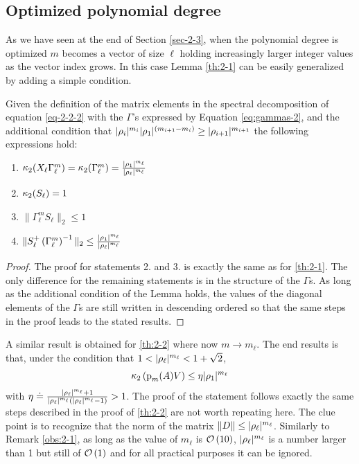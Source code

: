 \subsection{Optimized polynomial degree}
As we have seen at the end of Section \ref{sec-2-3}, when the polynomial degree is optimized $m$ becomes a vector of size $\ell$ holding increasingly larger integer values as the vector index grows. In this case Lemma \ref{th:2-1} can be easily generalized by adding a simple condition.
\begin{lemma}
\label{th:2-3}
Given the definition of the matrix elements in the spectral decomposition of equation \eqref{eq-2-2-2} with the $\Gamma$'s expressed by Equation \ref{eq:gammas-2}, and the additional condition that $|\rho_{i}|^{m_i} |\rho_{1}|^{(m_{i+1} - m_i)} \geq |\rho_{i+1}|^{m_{i+1}}$  the following expressions hold:
\begin{enumerate}
\setlength\itemsep{3pt}
    \item $\mathop\mathrm{\kappa}_2\nolimits(X_\ell \Gamma_\ell^m) = \mathop\mathrm{\kappa}_2\nolimits(\Gamma_\ell^m) = \frac{|\rho_{1}|^{m_\ell}}{|\rho_{\ell}|^{m_\ell}}$ 
    \item $\mathop\mathrm{\kappa}_2\nolimits(S_\ell) = 1$
    \item $\|\Gamma_\ell^m S_\ell\|_2 \leq 1$
    \item $\|S_\ell^+ \left(\Gamma_\ell^m\right)^{-1}\|_2 \leq \frac{|\rho_{1}|^{m_\ell}}{|\rho_{\ell}|^{m_\ell}}$
\end{enumerate}
\end{lemma}
\begin{proof}
The proof for statements 2. and 3. is exactly the same as for \cref{th:2-1}. The only difference for the remaining statements is in the structure of the $\Gamma$s. As long as the additional condition of the Lemma holds, the values of the diagonal elements of the $\Gamma$s are still written in descending ordered so that the same steps in the proof leads to the stated results. 
\end{proof}

A similar result is obtained for \cref{th:2-2} where now $ m \rightarrow m_\ell$. The end results is that, under the condition that $1 < |\rho_{\ell}|^{m_\ell} < 1 + \sqrt{2}$,
\begin{equation}
    \mathop\mathrm{\kappa}_2\nolimits \left({\textrm p}_{m} (A)V\right) \leq \eta |\rho_{1}|^{m_\ell}
\end{equation}
with $\eta \doteq \frac{|\rho_{\ell}|^{m_\ell} + 1}{|\rho_{\ell}|^{m_\ell} (|\rho_{\ell}|^{m_\ell} -1)} > 1$. The proof of the statement follows exactly the same steps described in the proof of \cref{th:2-2} are not worth repeating here. The clue point is to recognize that the norm of the matrix $\|D\| \leq |\rho_{\ell}|^{m_\ell}$. Similarly to Remark \ref{obs:2-1}, as long as the value of $m_\ell$ is $\mathcal{O}\left( 10 \right)$, $|\rho_{\ell}|^{m_\ell}$ is a number larger than 1 but still of $\mathcal{O}\left( 1 \right)$ and for all practical purposes it can be ignored.

